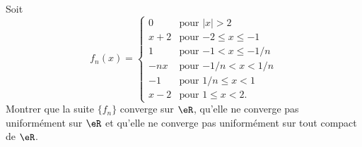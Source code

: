 \begin{exercice}\label{exo114}
Soit
\begin{equation}
f_n(x)=
	\begin{cases}
	0	&	\text{pour $| x |>2$}\\
	x+2	&	\text{pour $-2\leq x\leq -1$}\\
	1	&	\text{pour $-1<x\leq -1/n$}\\
	-nx	&	\text{pour $-1/n<x<1/n$}\\
	-1	&	\text{pour $1/n\leq x<1$}\\
	x-2	&	 \text{pour $1\leq x<2$.}
\end{cases}
\end{equation}
Montrer que la suite $\{ f_n \}$ converge sur $\eR$, qu'elle ne converge pas uniformément sur $\eR$ et qu'elle ne converge pas uniformément sur tout compact de $\eR$.

\end{exercice}


